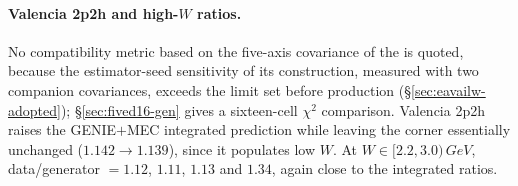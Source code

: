 \paragraph{Valencia 2p2h and high-$W$ ratios.} No compatibility metric based on the five-axis covariance of the \resFiveAxis{} is quoted, because the estimator-seed sensitivity of its construction, measured with two companion covariances, exceeds the limit set before production (\S\ref{sec:eavailw-adopted}); \S\ref{sec:fived16-gen} gives a sixteen-cell $\chi^{2}$ comparison. Valencia 2p2h raises the GENIE$+$MEC integrated prediction while leaving the corner essentially unchanged ($1.142\to1.139$), since it populates low $W$. At $W\in[2.2,3.0)\,\si{GeV}$, data/generator $=1.12$, $1.11$, $1.13$ and $1.34$, again close to the integrated ratios.

